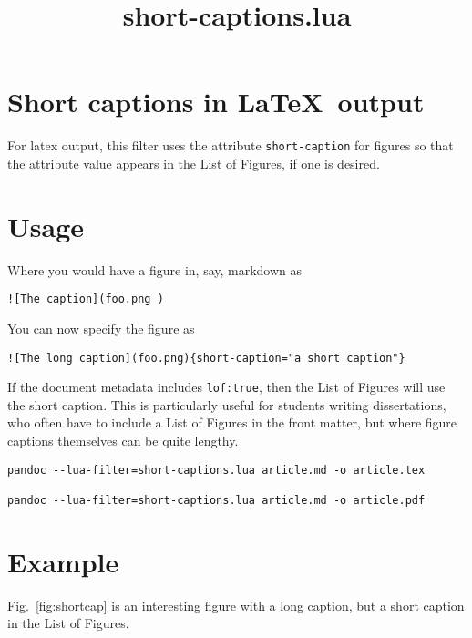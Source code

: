 \documentclass[
]{article}
\title{short-captions.lua}
\author{}
\date{}
\begin{document}
\maketitle

\listoffigures
\hypertarget{short-captions-in-output}{%
\section{\texorpdfstring{Short captions in
\LaTeX~output}{Short captions in ~output}}\label{short-captions-in-output}}

For latex output, this filter uses the attribute \texttt{short-caption}
for figures so that the attribute value appears in the List of Figures,
if one is desired.

\hypertarget{usage}{%
\section{Usage}\label{usage}}

Where you would have a figure in, say, markdown as

\begin{verbatim}
![The caption](foo.png ) 
\end{verbatim}

You can now specify the figure as

\begin{verbatim}
![The long caption](foo.png){short-caption="a short caption"} 
\end{verbatim}

If the document metadata includes \texttt{lof:true}, then the List of
Figures will use the short caption. This is particularly useful for
students writing dissertations, who often have to include a List of
Figures in the front matter, but where figure captions themselves can be
quite lengthy.

\begin{verbatim}
pandoc --lua-filter=short-captions.lua article.md -o article.tex

pandoc --lua-filter=short-captions.lua article.md -o article.pdf
\end{verbatim}

\hypertarget{example}{%
\section{Example}\label{example}}

Fig.~\ref{fig:shortcap} is an interesting figure with a long caption,
but a short caption in the List of Figures.
\end{document}
